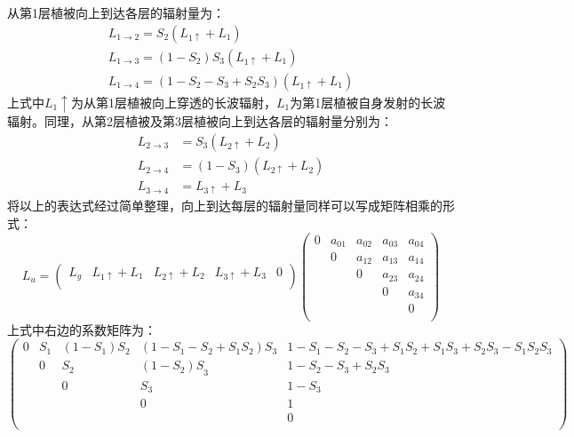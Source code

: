从第1层植被向上到达各层的辐射量为：
\begin{equation}
\begin{array}{l}L_{1 \rightarrow 2}=S_{2}\left(L_{1 \uparrow}+L_{1}\right) \\
     L_{1 \rightarrow 3}=\left(1-S_{2}\right) S_{3}\left(L_{1 \uparrow}+L_{1}\right) \\
      L_{1 \rightarrow 4}=\left(1-S_{2}-S_{3}+S_{2} S_{3}\right)\left(L_{1 \uparrow}+L_{1}\right)\end{array}
\end{equation}
上式中$L_1\uparrow$为从第1层植被向上穿透的长波辐射，$L_1$为第1层植被自身发射的长波辐射。同理，从第2层植被及第3层植被向上到达各层的辐射量分别为：
\begin{equation}
\begin{aligned} L_{2 \rightarrow 3} &=S_{3}\left(L_{2 \uparrow}+L_{2}\right) \\
     L_{2 \rightarrow 4} &=\left(1-S_{3}\right)\left(L_{2 \uparrow}+L_{2}\right) \\ 
     L_{3 \rightarrow 4} &=L_{3 \uparrow}+L_{3} \end{aligned}
\end{equation}
将以上的表达式经过简单整理，向上到达每层的辐射量同样可以写成矩阵相乘的形式：
\begin{equation}
{L}_{u}=\left(\begin{matrix}L_g&L_{1\uparrow}+L_1&L_{2\uparrow}+L_2&L_{3\uparrow}+L_3&0\\\end{matrix}
\right)\left(\begin{matrix}0&a_{01}&a_{02}&a_{03}&a_{04}\\&0&a_{12}&a_{13}&a_{14}\\
    &&0&a_{23}&a_{24}\\&&&0&a_{34}\\&&&&0\\\end{matrix}\right)
\end{equation}
上式中右边的系数矩阵为：
\begin{equation}
\left(\begin{matrix}0&S_1&\left(1-S_1\right)S_2&\left(1-S_1-S_2+S_1S_2\right)S_3&
    1-S_1-S_2-S_3+S_1S_2+S_1S_3+S_2S_3-S_1S_2S_3\\&0&S_2&{\left(1-S_2\right)S}_3&1-S_2-S_3+S_2S_3\\
    &&0&S_3&1-S_3\\&&&0&1\\&&&&0\\\end{matrix}\right)   
\end{equation}
